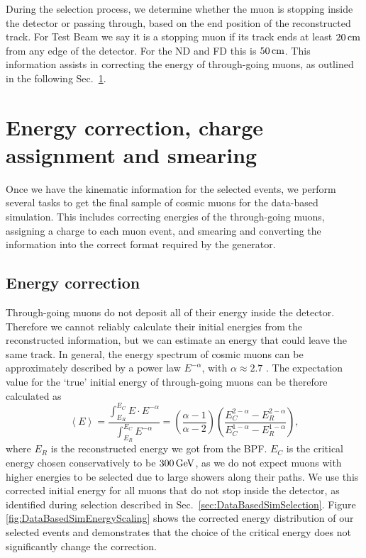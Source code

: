 During the selection process, we determine whether the muon is stopping inside the detector or passing through, based on the end position of the reconstructed track. For Test Beam we say it is a stopping muon if its track ends at least $\unit[20]{cm}$ from any edge of the detector. For the \gls{ND} and \gls{FD} this is $\unit[50]{cm}$. This information assists in correcting the energy of through-going muons, as outlined in the following Sec.~\ref{sec:DataBasedSimPython}.

\section{Energy correction, charge assignment and smearing}\label{sec:DataBasedSimPython}
Once we have the kinematic information for the selected events, we perform several tasks to get the final sample of cosmic muons for the data-based simulation. This includes correcting energies of the through-going muons, assigning a charge to each muon event, and smearing and converting the information into the correct format required by the generator.

\subsection*{Energy correction}
Through-going muons do not deposit all of their energy inside the detector. Therefore we cannot reliably calculate their initial energies from the reconstructed information, but we can estimate an energy that could leave the same track. In general, the energy spectrum of cosmic muons can be approximately described by a power law $E^{-\alpha}$, with $\alpha\approx2.7$ \cite{NOvA-doc-51327,PDG.pdf}. The expectation value for the `true' initial energy of through-going muons can be therefore calculated as
\begin{equation}
\left\langle E\right\rangle =\frac{\int^{E_C}_{E_R} E\cdot E^{-\alpha}}{\int^{E_C}_{E_R} E^{-\alpha}}=\left(\frac{\alpha -1}{\alpha -2}\right)\left(\frac{E_C^{2-\alpha}-E_R^{2-\alpha}}{E_C^{1-\alpha}-E_R^{1-\alpha}}\right),
\end{equation}
where $E_R$ is the reconstructed energy we got from the \gls{BPF}. $E_C$ is the critical energy chosen conservatively to be $\unit[300]{GeV}$, as we do not expect muons with higher energies to be selected due to large showers along their paths. We use this corrected initial energy for all muons that do not stop inside the detector, as identified during selection described in Sec.~\ref{sec:DataBasedSimSelection}. Figure \ref{fig:DataBasedSimEnergyScaling} shows the corrected energy distribution of our selected events and demonstrates that the choice of the critical energy does not significantly change the correction. 

